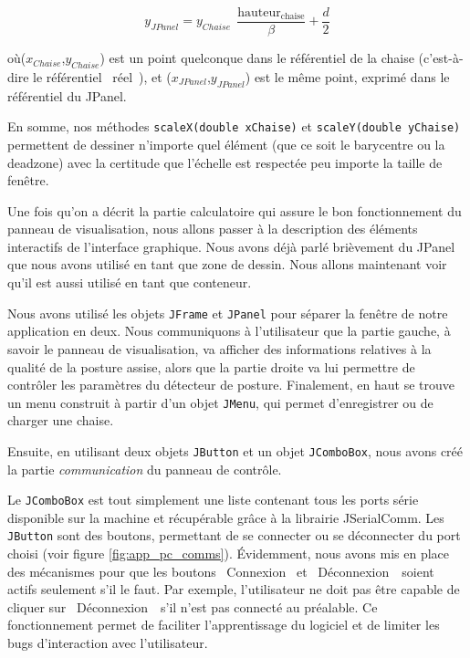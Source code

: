 \documentclass{polytech/polytech}
\begin{document}
\begin{equation}
\label{eqn:form_ref_vert}
y_{JPanel} = y_{Chaise}\ \ \frac{\mathrm{hauteur_{chaise}}}{\beta} + \frac{d}{2}
\end{equation}

où($x_{Chaise}$,$y_{Chaise}$) est un point quelconque dans le référentiel de la chaise (c'est-à-dire le référentiel \guillemotleft ~réel~\guillemotright ), et ($x_{JPanel}$,$y_{JPanel}$) est le même point, exprimé dans le référentiel du JPanel.

En somme, nos méthodes \texttt{scaleX(double xChaise)} et \texttt{scaleY(double yChaise)} permettent de dessiner n'importe quel élément (que ce soit le barycentre ou la deadzone) avec la certitude que l'échelle est respectée peu importe la taille de fenêtre.

Une fois qu'on a décrit la partie calculatoire qui assure le bon fonctionnement du panneau de visualisation, nous allons passer à la description des éléments interactifs de l'interface graphique. 
Nous avons déjà parlé brièvement du JPanel que nous avons utilisé en tant que zone de dessin. Nous allons maintenant voir qu'il est aussi utilisé en tant que conteneur.

Nous avons utilisé les objets \texttt{JFrame} et \texttt{JPanel} pour séparer la fenêtre de notre application en deux.
Nous communiquons à l'utilisateur que la partie gauche, à savoir le panneau de visualisation, va afficher des informations relatives à la qualité de la posture assise, alors que la partie droite va lui permettre de contrôler les paramètres du détecteur de posture.
 Finalement, en haut se trouve un menu construit à partir d'un objet \texttt{JMenu}, qui permet d'enregistrer ou de charger une chaise.

Ensuite, en utilisant deux objets \texttt{JButton} et un objet \texttt{JComboBox}, nous avons créé la partie \textit{communication} du panneau de contrôle.

 Le \texttt{JComboBox} est tout simplement une liste contenant tous les ports série disponible sur la machine et récupérable grâce à la librairie JSerialComm.
Les \texttt{JButton} sont des boutons, permettant de se connecter ou se déconnecter du port choisi (voir figure \ref{fig:app_pc_comms}). Évidemment, nous avons mis en place des mécanismes pour que les boutons \guillemotleft ~Connexion \guillemotright\ et \guillemotleft\ Déconnexion~\guillemotright\ soient actifs seulement s'il le faut.
Par exemple, l'utilisateur ne doit pas être capable de cliquer sur \guillemotleft ~Déconnexion~\guillemotright\ s'il n'est pas connecté au préalable. 
Ce fonctionnement permet de faciliter l'apprentissage du logiciel et de limiter les bugs d'interaction avec l'utilisateur.
\end{document}
